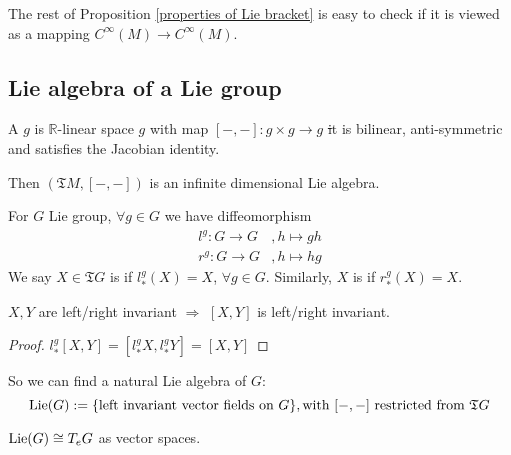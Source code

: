 The rest of Proposition \ref{properties of Lie bracket} is easy to check if it is viewed as a mapping  $ C^\infty(M)\rightarrow C^\infty(M) $.

\subsection{Lie algebra of a Lie group}
\begin{definition}
    A  $ g $ is  $ \mathbb{R} $-linear space  $ g $ with map   $ [-,-]:g\times g\rightarrow g $ \st it is bilinear, anti-symmetric and satisfies the Jacobian identity.
    
    Then  $ (\mathfrak{T}M,[-,-]) $ is an infinite dimensional Lie algebra.
\end{definition}
For  $ G $ Lie group,  $ \forall g\in G $ we have diffeomorphism  
\begin{align*}
    l^g:G\rightarrow G&,h\mapsto gh\\
    r^g:G\rightarrow G&,h\mapsto hg   
\end{align*}
We say  $ X\in \mathfrak{T}G $ is  if  $ l_*^g(X)=X $,  $ \forall g\in G $. Similarly,  $ X $ is  if  $ r_*^g(X)=X $.   
\begin{proposition}
     $ X,Y $ are left/right invariant  $ \Rightarrow  $  $ [X,Y] $ is left/right invariant.  
\end{proposition}
\begin{proof}
     $ l_*^g[X,Y]=[l_*^gX,l_*^gY]=[X,Y] $ 
\end{proof}
So we can find a natural Lie algebra of  $ G $: 
\[\name{$ \Lie(G) $}:=\{\text{left invariant vector fields on  $ G $}\},\text{with  $ [-,-] $ restricted from  $ \mathfrak{T}G $}\]
\begin{corollary}
     $ \displaystyle \mathrm{Lie}(G)\cong T_eG $ as vector spaces. 
\end{corollary}
